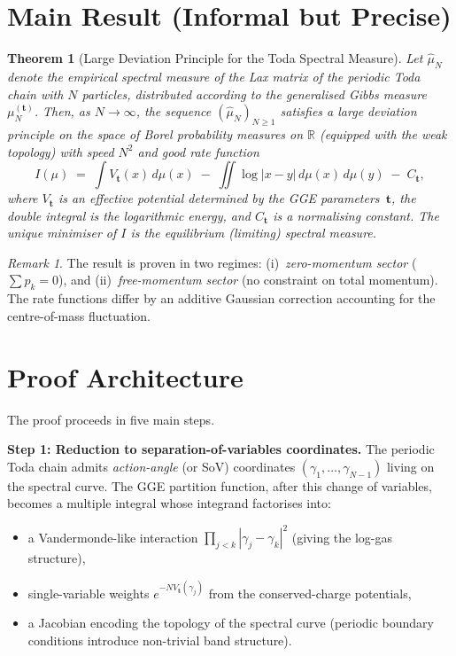 \documentclass[11pt,a4paper]{article}
\newtheorem{theorem}{Theorem}
\theoremstyle{remark}
\newtheorem*{remark}{Remark}
\begin{document}
\section{Main Result (Informal but Precise)}

\begin{theorem}[Large Deviation Principle for the Toda Spectral Measure]
Let $\hat\mu_N$ denote the empirical spectral measure of the Lax matrix of the periodic Toda chain with $N$ particles, distributed according to the generalised Gibbs measure $\mu_N^{(\mathbf{t})}$.
Then, as $N\to\infty$, the sequence $(\hat\mu_N)_{N\ge 1}$ satisfies a large deviation principle on the space of Borel probability measures on $\mathbb{R}$ (equipped with the weak topology) with speed $N^2$ and good rate function
\[
  I(\mu) \;=\; \int V_{\mathbf{t}}(x)\,d\mu(x) \;-\; \iint \log|x-y|\,d\mu(x)\,d\mu(y) \;-\; C_{\mathbf{t}},
\]
where $V_{\mathbf{t}}$ is an effective potential determined by the GGE parameters~$\mathbf{t}$, the double integral is the logarithmic energy, and $C_{\mathbf{t}}$ is a normalising constant.  The unique minimiser of $I$ is the equilibrium (limiting) spectral measure.
\end{theorem}

\begin{remark}
The result is proven in two regimes:
(i)~\emph{zero-momentum sector} ($\sum p_k=0$), and
(ii)~\emph{free-momentum sector} (no constraint on total momentum).
The rate functions differ by an additive Gaussian correction accounting for the centre-of-mass fluctuation.
\end{remark}

\section{Proof Architecture}

The proof proceeds in five main steps.

\medskip\noindent
\textbf{Step 1: Reduction to separation-of-variables coordinates.}
The periodic Toda chain admits \emph{action-angle} (or SoV) coordinates $(\gamma_1,\dots,\gamma_{N-1})$ living on the spectral curve.
The GGE partition function, after this change of variables, becomes a multiple integral whose integrand factorises into:
\begin{itemize}[nosep]
  \item a Vandermonde-like interaction $\prod_{j<k}|\gamma_j-\gamma_k|^2$ (giving the log-gas structure),
  \item single-variable weights $e^{-NV_{\mathbf{t}}(\gamma_j)}$ from the conserved-charge potentials,
  \item a Jacobian encoding the topology of the spectral curve (periodic boundary conditions introduce non-trivial band structure).
\end{itemize}
\end{document}
